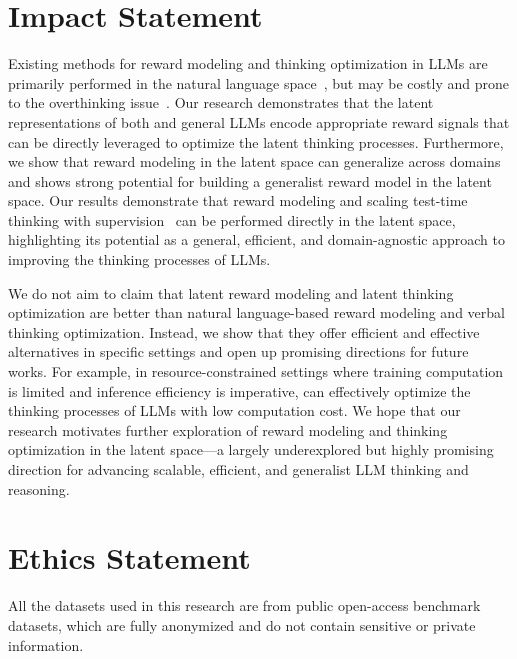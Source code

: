 \documentclass{article} %
\begin{document}
\section{Impact Statement}
\label{appendix:impact_statement}
Existing methods for reward modeling and thinking optimization in LLMs are primarily performed in the natural language space~\citep{wang-etal-2024-math,lu2024autopsv}, but may be costly and prone to the overthinking issue~\citep{sui2025stop}. Our research demonstrates that the latent representations of both \LRLM and general LLMs encode appropriate reward signals that can be directly leveraged to optimize the latent thinking processes. Furthermore, we show that reward modeling in the
latent space can generalize across domains and shows strong
potential for building a generalist reward model in the latent space.
Our results demonstrate that reward modeling and scaling test-time thinking with supervision~\citep{muennighoff2025s1,guo2025deepseek,setlur2025scaling} can be performed directly in the latent space, highlighting its potential as a general, efficient, and domain-agnostic approach to improving the thinking processes of LLMs. 

We do not aim to claim that latent reward modeling and latent thinking optimization are better than natural language-based reward modeling and verbal thinking optimization. Instead, we show that they offer efficient and effective alternatives in specific settings and open up promising directions for future works. For example, in resource-constrained settings where training computation is limited and inference efficiency is imperative, \LTO can effectively optimize the thinking processes of LLMs with low computation cost. We hope that our research motivates further exploration of reward modeling and thinking optimization in the latent space---a largely underexplored but highly promising direction for advancing scalable, efficient, and generalist LLM thinking and reasoning.
\section{Ethics Statement}
\label{appendix:ethics_statement}
All the datasets used in this research are from public open-access benchmark datasets, which are fully anonymized and do not contain sensitive or private information.
\end{document}
